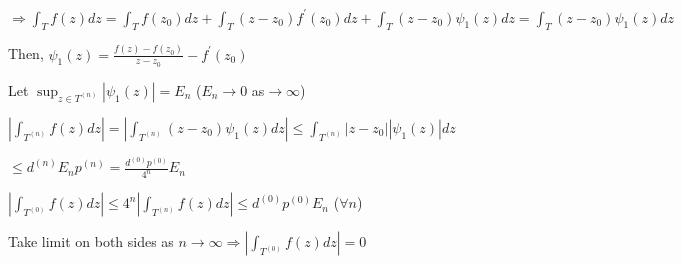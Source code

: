\documentclass{article}
\begin{document}
\begin{flushleft}
$\Rightarrow \int_{T}^{} f(z) dz= \int_{T}^{} f(z_0) dz + \int_{T}^{} (z-z_0)f^{'}(z_0) dz + \int_{T}^{} (z-z_0)\psi_1(z) dz= \int_{T}^{} (z-z_0)\psi_1(z) dz$

Then, $\psi_1(z)= \frac{f(z)-f(z_0)}{z-z_0}-f^{'}(z_0)$

Let $\sup_{z\in T^{(n)}}|\psi_1(z)|= E_n$ ($E_n\rightarrow 0$ as$\rightarrow \infty$)

$|\int_{T^{(n)}}^{} f(z) dz|=|\int_{T^{(n)}}^{} (z-z_0)\psi_1(z) dz|\leq \int_{T^{(n)}}^{} |z-z_0||\psi_1(z)| dz$

$\leq d^{(n)}E_np^{(n)}=\frac{d^{(0)}p^{(0)}}{4^n}E_n$

$|\int_{T^{(0)}}^{} f(z) dz|\leq 4^n|\int_{T^{(n)}}^{} f(z) dz|\leq d^{(0)}p^{(0)}E_n$ ($\forall n$)

Take limit on both sides as $n\rightarrow \infty\Rightarrow |\int_{T^{(0)}}^{} f(z) dz|=0$ 

\end{flushleft}
\end{document}

